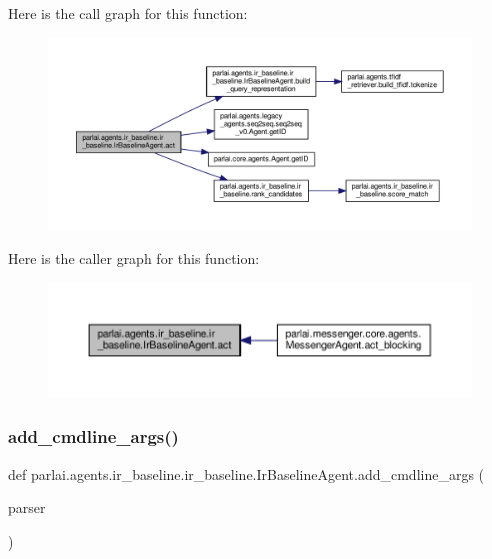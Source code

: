 Here is the call graph for this function\+:
\nopagebreak
\begin{figure}[H]
\begin{center}
\leavevmode
\includegraphics[width=350pt]{classparlai_1_1agents_1_1ir__baseline_1_1ir__baseline_1_1IrBaselineAgent_af4e39c5613a045434a38d260e6fc03e6_cgraph}
\end{center}
\end{figure}
Here is the caller graph for this function\+:
\nopagebreak
\begin{figure}[H]
\begin{center}
\leavevmode
\includegraphics[width=350pt]{classparlai_1_1agents_1_1ir__baseline_1_1ir__baseline_1_1IrBaselineAgent_af4e39c5613a045434a38d260e6fc03e6_icgraph}
\end{center}
\end{figure}
\mbox{\label{classparlai_1_1agents_1_1ir__baseline_1_1ir__baseline_1_1IrBaselineAgent_aefd4949ff6e98ac3ccb4b7348794080d}} 
\subsubsection{\texorpdfstring{add\+\_\+cmdline\+\_\+args()}{add\_cmdline\_args()}}
{\footnotesize\ttfamily def parlai.\+agents.\+ir\+\_\+baseline.\+ir\+\_\+baseline.\+Ir\+Baseline\+Agent.\+add\+\_\+cmdline\+\_\+args (\begin{DoxyParamCaption}\item[{}]{parser }\end{DoxyParamCaption})\hspace{0.3cm}{\ttfamily [static]}}

